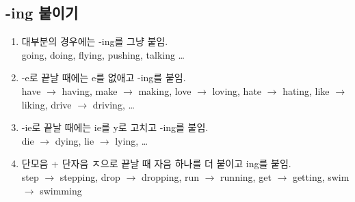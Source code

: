 \documentclass[a4paper, 12pt, twocolumn]{oblivoir}
\begin{document}
    \subsection{-ing 붙이기}
    \begin{enumerate}
        \item 대부분의 경우에는 -ing를 그냥 붙임. \\ going, doing, flying, pushing, talking \dots
        \item -e로 끝날 때에는 e를 없애고 -ing를 붙임. \\ have $\rightarrow$ having, make $\rightarrow$ making, love $\rightarrow$ loving, hate $\rightarrow$ hating, like $\rightarrow$ liking, drive $\rightarrow$ driving, \dots
        \item -ie로 끝날 때에는 ie를 y로 고치고 -ing를 붙임. \\ die $\rightarrow$ dying, lie $\rightarrow$ lying, \dots
        \item 단모음 + 단자음 ㅈ으로 끝날 때 자음 하나를 더 붙이고 ing를 붙임. \\ step $\rightarrow$ stepping, drop $\rightarrow$ dropping, run $\rightarrow$ running, get $\rightarrow$ getting, swim $\rightarrow$ swimming 
    \end{enumerate}
\end{document}
